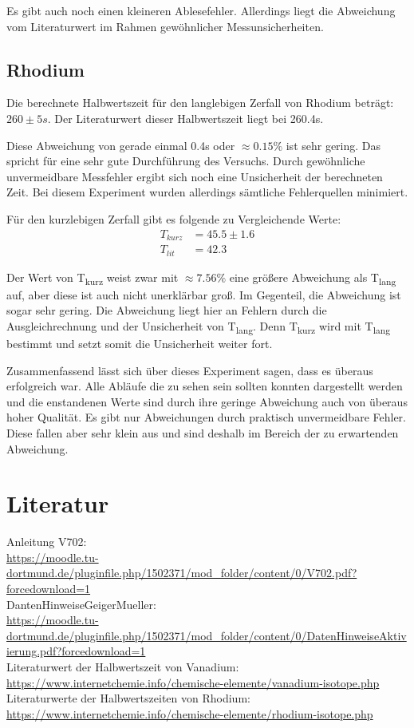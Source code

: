 \noindent Es gibt auch noch einen kleineren Ablesefehler. Allerdings liegt die Abweichung vom Literaturwert im Rahmen gewöhnlicher Messunsicherheiten. 

\subsection{Rhodium}

\noindent Die berechnete Halbwertszeit für den langlebigen Zerfall von Rhodium beträgt: $260 \pm 5s$.
Der Literaturwert dieser Halbwertszeit liegt bei 260.4s.

\noindent Diese Abweichung von gerade einmal 0.4s oder $\approx 0.15\%$ ist sehr gering. Das spricht für eine sehr gute Durchführung des Versuchs. Durch gewöhnliche unvermeidbare Messfehler ergibt sich noch eine Unsicherheit der berechneten Zeit. Bei diesem Experiment wurden allerdings sämtliche Fehlerquellen minimiert. 

\noindent Für den kurzlebigen Zerfall gibt es folgende zu Vergleichende Werte:
\begin{align}
    T_{kurz} &= 45.5 \pm 1.6 \nonumber\\
    T_{lit} &= 42.3  \nonumber
\end{align}

\noindent Der Wert von T\textsubscript{kurz} weist zwar mit $\approx 7.56\%$ eine größere Abweichung als T\textsubscript{lang} auf, aber diese ist auch nicht unerklärbar groß. Im Gegenteil, die Abweichung ist sogar sehr gering. Die Abweichung liegt hier an Fehlern durch die Ausgleichrechnung und der Unsicherheit von T\textsubscript{lang}. Denn T\textsubscript{kurz} wird mit T\textsubscript{lang} bestimmt und setzt somit die Unsicherheit weiter fort.   

\noindent Zusammenfassend lässt sich über dieses Experiment sagen, dass es überaus erfolgreich war. Alle Abläufe die zu sehen sein sollten konnten dargestellt werden und die enstandenen Werte sind durch ihre geringe Abweichung auch von überaus hoher Qualität. Es gibt nur Abweichungen durch praktisch unvermeidbare Fehler. Diese fallen aber sehr klein aus und sind deshalb im Bereich der zu erwartenden Abweichung.

\section{Literatur}

Anleitung V702:\\
\url{https://moodle.tu-dortmund.de/pluginfile.php/1502371/mod_folder/content/0/V702.pdf?forcedownload=1}\\
DantenHinweiseGeigerMueller:\\
\url{https://moodle.tu-dortmund.de/pluginfile.php/1502371/mod_folder/content/0/DatenHinweiseAktivierung.pdf?forcedownload=1}\\
Literaturwert der Halbwertszeit von Vanadium:\\
\url{https://www.internetchemie.info/chemische-elemente/vanadium-isotope.php}\\
Literaturwerte der Halbwertszeiten von Rhodium:\\
\url{https://www.internetchemie.info/chemische-elemente/rhodium-isotope.php}\\


